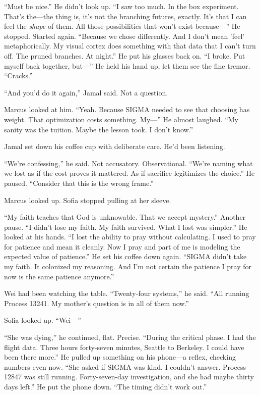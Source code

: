 ``Must be nice.'' He didn't look up. ``I saw too much. In the box experiment. That's the---the thing is, it's not the branching futures, exactly. It's that I can feel the \emph{shape} of them. All those possibilities that won't exist because---'' He stopped. Started again. ``Because we chose differently. And I don't mean 'feel' metaphorically. My visual cortex does something with that data that I can't turn off. The pruned branches. At night.'' He put his glasses back on. ``I broke. Put myself back together, but---'' He held his hand up, let them see the fine tremor. ``Cracks.''

``And you'd do it again,'' Jamal said. Not a question.

Marcus looked at him. ``Yeah. Because SIGMA needed to see that choosing has weight. That optimization costs something. My---'' He almost laughed. ``My sanity was the tuition. Maybe the lesson took. I don't know.''

Jamal set down his coffee cup with deliberate care. He'd been listening.

``We're confessing,'' he said. Not accusatory. Observational. ``We're naming what we lost as if the cost proves it mattered. As if sacrifice legitimizes the choice.'' He paused. ``Consider that this is the wrong frame.''

Marcus looked up. Sofia stopped pulling at her sleeve.

``My faith teaches that God is unknowable. That we accept mystery.'' Another pause. ``I didn't lose my faith. My faith survived. What I lost was simpler.'' He looked at his hands. ``I lost the ability to pray without calculating. I used to pray for patience and mean it cleanly. Now I pray and part of me is modeling the expected value of patience.'' He set his coffee down again. ``SIGMA didn't take my faith. It colonized my reasoning. And I'm not certain the patience I pray for now is the same patience anymore.''

Wei had been watching the table. ``Twenty-four systems,'' he said. ``All running Process 13241. My mother's question is in all of them now.''

Sofia looked up. ``Wei---''

``She was dying,'' he continued, flat. Precise. ``During the critical phase. I had the flight data. Three hours forty-seven minutes, Seattle to Berkeley. I could have been there more.'' He pulled up something on his phone---a reflex, checking numbers even now. ``She asked if SIGMA was kind. I couldn't answer. Process 12847 was still running. Forty-seven-day investigation, and she had maybe thirty days left.'' He put the phone down. ``The timing didn't work out.''

